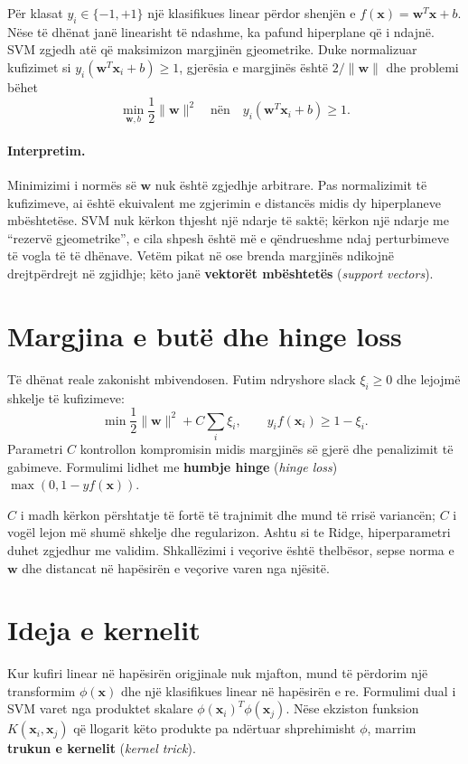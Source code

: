 \documentclass[12pt,a4paper,oneside]{book}
\newcommand{\term}[2]{\textbf{#1} (\textit{#2})}
\begin{document}
Për klasat $y_i\in\{-1,+1\}$ një klasifikues linear përdor shenjën e $f(\mathbf x)=\mathbf w^T\mathbf x+b$. Nëse të dhënat janë linearisht të ndashme, ka pafund hiperplane që i ndajnë. SVM zgjedh atë që maksimizon margjinën gjeometrike. Duke normalizuar kufizimet si $y_i(\mathbf w^T\mathbf x_i+b)\ge1$, gjerësia e margjinës është $2/\|\mathbf w\|$ dhe problemi bëhet
\[
\min_{\mathbf w,b}\frac12\|\mathbf w\|^2\quad\text{nën}\quad y_i(\mathbf w^T\mathbf x_i+b)\ge1.
\]

\paragraph{Interpretim.}
Minimizimi i normës së $\mathbf w$ nuk është zgjedhje arbitrare. Pas normalizimit të kufizimeve, ai është ekuivalent me zgjerimin e distancës midis dy hiperplaneve mbështetëse. SVM nuk kërkon thjesht një ndarje të saktë; kërkon një ndarje me ``rezervë gjeometrike'', e cila shpesh është më e qëndrueshme ndaj perturbimeve të vogla të të dhënave.
Vetëm pikat në ose brenda margjinës ndikojnë drejtpërdrejt në zgjidhje; këto janë \term{vektorët mbështetës}{support vectors}.

\section{Margjina e butë dhe hinge loss}

Të dhënat reale zakonisht mbivendosen. Futim ndryshore slack $\xi_i\ge0$ dhe lejojmë shkelje të kufizimeve:
\[
\min \frac12\|\mathbf w\|^2+C\sum_i\xi_i,
\qquad y_if(\mathbf x_i)\ge1-\xi_i.
\]
Parametri $C$ kontrollon kompromisin midis margjinës së gjerë dhe penalizimit të gabimeve. Formulimi lidhet me \term{humbje hinge}{hinge loss} $\max(0,1-yf(\mathbf x))$.

$C$ i madh kërkon përshtatje të fortë të trajnimit dhe mund të rrisë variancën; $C$ i vogël lejon më shumë shkelje dhe regularizon. Ashtu si te Ridge, hiperparametri duhet zgjedhur me validim. Shkallëzimi i veçorive është thelbësor, sepse norma e $\mathbf w$ dhe distancat në hapësirën e veçorive varen nga njësitë.

\section{Ideja e kernelit}

Kur kufiri linear në hapësirën origjinale nuk mjafton, mund të përdorim një transformim $\phi(\mathbf x)$ dhe një klasifikues linear në hapësirën e re. Formulimi dual i SVM varet nga produktet skalare $\phi(\mathbf x_i)^T\phi(\mathbf x_j)$. Nëse ekziston funksion $K(\mathbf x_i,\mathbf x_j)$ që llogarit këto produkte pa ndërtuar shprehimisht $\phi$, marrim \term{trukun e kernelit}{kernel trick}.
\end{document}
